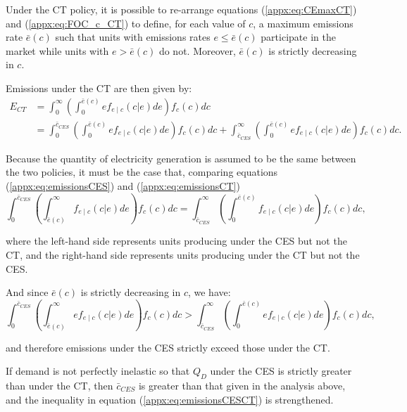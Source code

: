 \documentclass[12pt]{article}
\begin{document}
Under the CT policy, it is possible to re-arrange equations (\ref{appx:eq:CEmaxCT}) and (\ref{appx:eq:FOC_c_CT}) to define, for each value of $c$, a maximum emissions rate $\bar{e}(c)$ such that units with emissions rates $e\leq\bar{e}(c)$ participate in the market while units with $e>\bar{e}(c)$ do not. Moreover, $\bar{e}(c)$ is strictly decreasing in $c$.

Emissions under the CT are then given by:
\begin{align}
    E_{CT} &= \int_0^{\infty}\left(\int_0^{\bar{e}(c)} ef_{e\mid c}(c|e)de\right)f_c(c)dc \nonumber \\
    &= \int_0^{\bar{c}_{CES}}\left(\int_0^{\bar{e}(c)} ef_{e\mid c}(c|e)de\right)f_c(c)dc + \int_{\bar{c}_{CES}}^{\infty}\left(\int_0^{\bar{e}(c)} ef_{e\mid c}(c|e)de\right)f_c(c)dc. \label{appx:eq:emissionsCT}
\end{align}

Because the quantity of electricity generation is assumed to be the same between the two policies, it must be the case that, comparing equations (\ref{appx:eq:emissionsCES}) and (\ref{appx:eq:emissionsCT})
\begin{equation}
    \int_0^{\bar{c}_{CES}}\left(\int_{\bar{e}(c)}^\infty f_{e\mid c}(c|e)de\right)f_c(c)dc = \int_{\bar{c}_{CES}}^{\infty}\left(\int_0^{\bar{e}(c)} f_{e\mid c}(c|e)de\right)f_c(c)dc,
\end{equation}

\noindent where the left-hand side represents units producing under the CES but not the CT, and the right-hand side represents units producing under the CT but not the CES.

And since $\bar{e}(c)$ is strictly decreasing in $c$, we have:
\begin{equation}
    \int_0^{\bar{c}_{CES}}\left(\int_{\bar{e}(c)}^\infty ef_{e\mid c}(c|e)de\right)f_c(c)dc > \int_{\bar{c}_{CES}}^{\infty}\left(\int_0^{\bar{e}(c)} ef_{e\mid c}(c|e)de\right)f_c(c)dc, \label{appx:eq:emissionsCESCT}
\end{equation}

\noindent and therefore emissions under the CES strictly exceed those under the CT.

If demand is not perfectly inelastic so that $Q_D$ under the CES is strictly greater than under the CT, then $\bar{c}_{CES}$ is greater than that given in the analysis above, and the inequality in equation (\ref{appx:eq:emissionsCESCT}) is strengthened.
\end{document}
